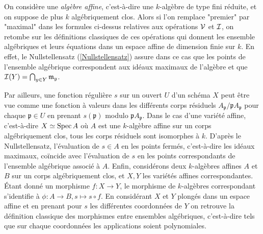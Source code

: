 \begin{rem}
On considère une \textit{algèbre affine}, c'est-à-dire une $k$-algèbre de type fini réduite, et on suppose de plus $k$ algébriquement clos. Alors si l'on remplace "premier" par "maximal" dans les formules ci-dessus relatives aux opérations $\mathcal{V}$ et $\mathcal{I}$, on retombe sur les définitions classiques de ces opérations qui donnent les ensemble algébriques et leurs équations dans un espace affine de dimension finie sur $k$. En effet, le Nullstellensatz (\ref{Nullstellensatz}) assure dans ce cas que les points de l'ensemble algébrique correspondent aux idéaux maximaux de l'algèbre et que $\mathcal{I}(Y)=\bigcap_{y\in Y}\mathfrak{m}_y$.

Par ailleurs, une fonction régulière $s$ sur un ouvert $U$ d'un schéma $X$ peut être vue comme une fonction à valeurs dans les différents corps résiduels $A_\mathfrak{p}/\mathfrak{p}A_\mathfrak{p}$ pour chaque $\mathfrak{p}\in U$ en prenant $s(\mathfrak{p})$ modulo $\mathfrak{p}A_\mathfrak{p}$. Dans le cas d'une variété affine, c'est-à-dire $X\simeq \operatorname{Spec} A$ où $A$ est une $k$-algèbre affine sur un corps algébriquement clos, tous les corps résiduels sont isomorphes à $k$. D'après le Nullstellensatz, l'évaluation de $s\in A$ en les points fermés, c'est-à-dire les idéaux maximaux, coïncide avec l'évaluation de $s$ en les points correspondants de l'ensemble algébrique associé à $A$. Enfin, considérons deux $k$-algèbres affines $A$ et $B$ sur un corps algébriquement clos, et $X, Y$ les variétés affines correspondantes. Étant donné un morphisme $f:X\rightarrow Y$, le morphisme de $k$-algèbres correspondant s'identifie à $\phi:A\rightarrow B,s\mapsto s\circ f$. En considérant $X$ et $Y$ plongés dans un espace affine et en prenant pour $s$ les différentes coordonnées de $Y$ on retrouve la définition classique des morphismes entre ensembles algébriques, c'est-à-dire tels que sur chaque coordonnées les applications soient polynomiales.
\end{rem}

